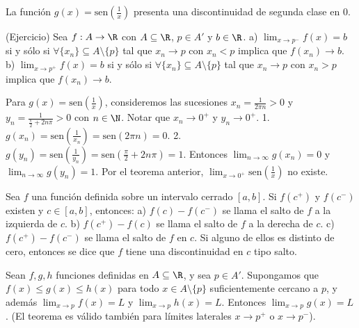 \begin{example} %
La función $g(x) = \mathrm{sen}\left(\frac{1}{x}\right)$ presenta una discontinuidad de segunda clase en $0$. %
\end{example}

\begin{teorema} %
(Ejercicio) Sea $f: A \to \R$ con $A \subseteq \R$, $p \in A'$ y $b \in \R$. %
a) $\lim_{x \to p^-} f(x) = b$ si y sólo si $\forall \{x_n\} \subseteq A \setminus \{p\}$ tal que $x_n \to p$ con $x_n < p$ implica que $f(x_n) \to b$. %
b) $\lim_{x \to p^+} f(x) = b$ si y sólo si $\forall \{x_n\} \subseteq A \setminus \{p\}$ tal que $x_n \to p$ con $x_n > p$ implica que $f(x_n) \to b$. %
\end{teorema}

\begin{remark} %
Para $g(x) = \mathrm{sen}\left(\frac{1}{x}\right)$, consideremos las sucesiones $x_n = \frac{1}{2\pi n} > 0$ y $y_n = \frac{1}{\frac{\pi}{2} + 2n\pi} > 0$ con $n \in \N$. %
Notar que $x_n \to 0^+$ y $y_n \to 0^+$. %
1. $g(x_n) = \mathrm{sen}\left(\frac{1}{x_n}\right) = \mathrm{sen}(2\pi n) = 0$. %
2. $g(y_n) = \mathrm{sen}\left(\frac{1}{y_n}\right) = \mathrm{sen}\left(\frac{\pi}{2} + 2n\pi\right) = 1$. %
Entonces $\lim_{n \to \infty} g(x_n) = 0$ y $\lim_{n \to \infty} g(y_n) = 1$. %
Por el teorema anterior, $\lim_{x \to 0^+} \mathrm{sen}\left(\frac{1}{x}\right)$ no existe. %
\end{remark}

\begin{definicion} %
Sea $f$ una función definida sobre un intervalo cerrado $[a, b]$. Si $f(c^+)$ y $f(c^-)$ existen y $c \in [a, b]$, entonces: %
a) $f(c) - f(c^-)$ se llama el salto de $f$ a la izquierda de $c$. %
b) $f(c^+) - f(c)$ se llama el salto de $f$ a la derecha de $c$. %
c) $f(c^+) - f(c^-)$ se llama el salto de $f$ en $c$. %
Si alguno de ellos es distinto de cero, entonces se dice que $f$ tiene una discontinuidad en $c$ tipo salto. %
\end{definicion}

\begin{teorema} %
Sean $f, g, h$ funciones definidas en $A \subseteq \R$, y sea $p \in A'$. %
Supongamos que $f(x) \le g(x) \le h(x)$ para todo $x \in A \setminus \{p\}$ suficientemente cercano a $p$, y además $\lim_{x \to p} f(x) = L$ y $\lim_{x \to p} h(x) = L$. %
Entonces $\lim_{x \to p} g(x) = L$. (El teorema es válido también para límites laterales $x \to p^+$ o $x \to p^-$). %
\end{teorema}


